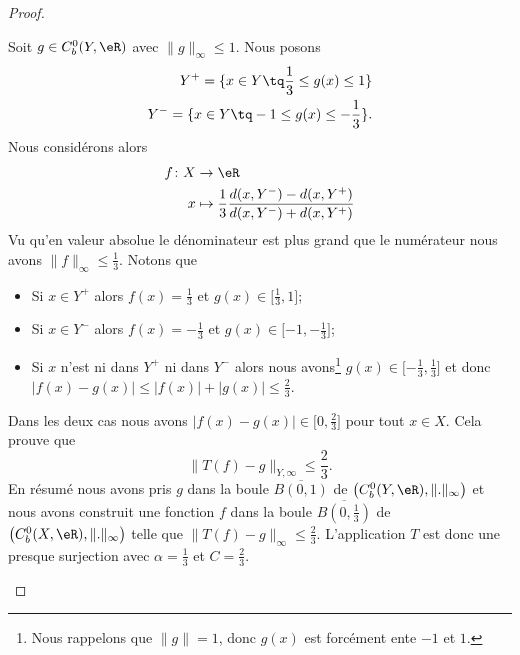 \begin{proof}
\begin{subproof}
    Soit \( g\in C^0_b(Y,\eR)\) avec \( \| g \|_{\infty}\leq 1\). Nous posons
    \begin{subequations}
        \begin{align}
            Y^+=\{ x\in Y\tq \frac{1}{ 3 }\leq g(x)\leq 1 \}\\
            Y^-=\{ x\in Y\tq -1\leq g(x)\leq -\frac{1}{ 3 } \}.
        \end{align}
    \end{subequations}
    Nous considérons alors
    \begin{equation}
        \begin{aligned}
            f\colon X&\to \eR \\
            x&\mapsto \frac{1}{ 3 }\frac{ d(x,Y^-)-d(x,Y^+) }{ d(x,Y^-)+d(x,Y^+) } 
        \end{aligned}
    \end{equation}
    Vu qu'en valeur absolue le dénominateur est plus grand que le numérateur nous avons \( \| f \|_{\infty}\leq \frac{1}{ 3 }\). Notons que
    \begin{itemize}
        \item Si \( x\in Y^+\) alors \( f(x)=\frac{1}{ 3 }\) et \( g(x)\in\mathopen[ \frac{1}{ 3 } , 1 \mathclose]\);
        \item Si \( x\in Y^-\) alors \( f(x)=-\frac{1}{ 3 }\) et \( g(x)\in\mathopen[-1,-\frac{1}{ 3 } \mathclose]\);
        \item Si \( x\) n'est ni dans \( Y^+\) ni dans \( Y^-\) alors nous avons\footnote{Nous rappelons que \( \| g \|=1\), donc \( g(x)\) est forcément ente \( -1\) et \( 1\).} \( g(x)\in\mathopen[ -\frac{1}{ 3 } , \frac{1}{ 3 } \mathclose]\) et donc \( \big| f(x)-g(x) \big|\leq \big| f(x) \big|+\big| g(x) \big|\leq \frac{ 2 }{ 3 }\).
    \end{itemize}
    Dans les deux cas nous avons \( \big| f(x)-g(x) \big|\in\mathopen[ 0 , \frac{ 2 }{ 3 } \mathclose]\) pour tout \( x\in X\). Cela prouve que
    \begin{equation}
        \| T(f)-g \|_{Y,\infty}\leq \frac{ 2 }{ 3 }.
    \end{equation}
    En résumé nous avons pris \( g\) dans la boule \( \overline{ B(0,1) }\) de \( \big( C^0_b(Y,\eR), \| . \|_{\infty} \big)\) et nous avons construit une fonction \( f\) dans la boule \( \overline{ B(0,\frac{1}{ 3 }) }\) de \( \big( C^0_b(X,\eR),\| . \|_{\infty} \big)\) telle que \( \| T(f)-g \|_{\infty}\leq \frac{ 2 }{ 3 }\). L'application \( T\) est donc une presque surjection avec \( \alpha=\frac{1}{ 3 }\) et \( C=\frac{ 2 }{ 3 }\).


\end{subproof}
\end{proof}
